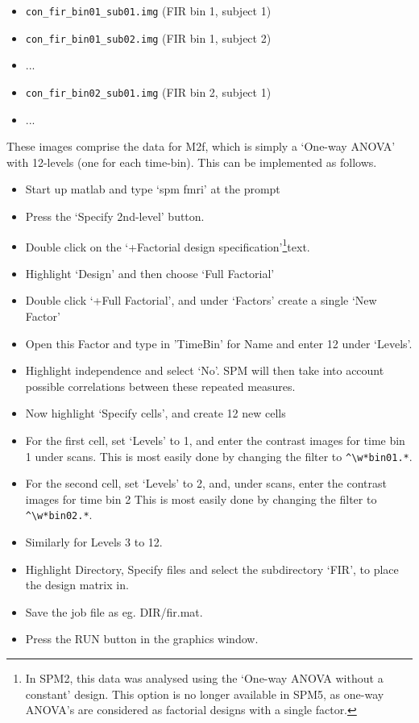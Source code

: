 \documentclass[a4paper,titlepage]{book}
\newcommand{\bi}{\begin{itemize}}
\newcommand{\ei}{\end{itemize}}
\begin{document}
\bi
\item{\verb!con_fir_bin01_sub01.img!	(FIR bin 1, subject 1)}
\item{\verb!con_fir_bin01_sub02.img!	(FIR bin 1, subject 2)}
\item{...}
\item{\verb!con_fir_bin02_sub01.img!	(FIR bin 2, subject 1)}
\item{...}
\ei
These images comprise the data for M2f, which is simply a `One-way ANOVA' with 12-levels (one for each time-bin). This can be implemented as follows.
\bi
\item{Start up matlab and type `spm fmri' at the prompt}
\item{Press the `Specify 2nd-level' button.}
\item{Double click on the `+Factorial design specification'\footnote{In SPM2, this data was analysed using the `One-way ANOVA without a constant' design. This option is no longer available in SPM5, as one-way ANOVA's are considered as factorial designs with a single factor.}text.}
\item{Highlight `Design' and then choose `Full Factorial'}
\item{Double click `+Full Factorial', and under `Factors' create a single `New Factor'}
\item{Open this Factor and type in 'TimeBin' for Name and enter 12 under `Levels'.}
\item{Highlight independence and select `No'. SPM will then take into account possible correlations between these repeated measures.}
\item{Now highlight `Specify cells', and create 12 new cells}  
\item{For the first cell, set `Levels' to 1, and enter the contrast images for time bin 1 under scans. This is most easily done by changing the filter to \verb!^\w*bin01.*!.}    
\item{For the second cell, set `Levels' to 2, and, under scans, enter the 
contrast images for time bin 2 This is most easily done by changing the filter to \verb!^\w*bin02.*!.}   
\item{Similarly for Levels 3 to 12.}               
\item{Highlight Directory, Specify files and select the 
subdirectory `FIR', to place the design matrix in.}
\item{Save the job file as eg. {\sf DIR/fir.mat}}.
\item{Press the RUN button in the graphics window.}
\ei
\end{document}
